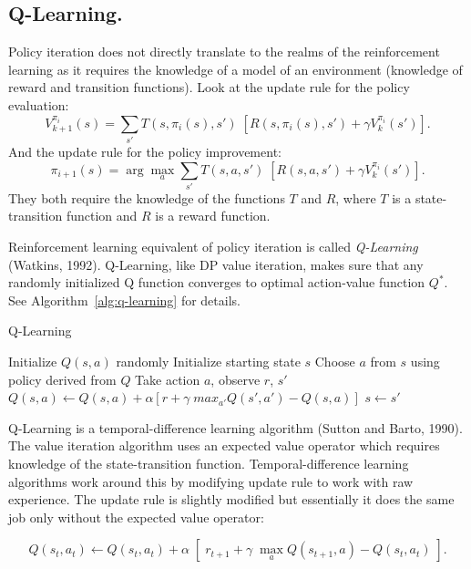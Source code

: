 \subsection{Q-Learning.}
\label{sec:q-learning}
Policy iteration does not directly translate to the realms of the reinforcement learning as it requires the knowledge of a model of an environment (knowledge of reward and transition functions). Look at the update rule for the policy evaluation:
$$ V_{k+1}^{\pi_{i}}(s) = \displaystyle\sum_{s'}T(s,\pi_{i}(s),s')\;[R(s,\pi_{i}(s),s')+\gamma V_{k}^{\pi_{i}}(s')]. $$
And the update rule for the policy improvement:
$$ \pi_{i+1}(s) = \arg\max_{a}\displaystyle\sum_{s'}T(s,a,s')\;[R(s,a,s')+\gamma V_{k}^{\pi_{i}}(s')]. $$
They both require the knowledge of the functions $T$ and $R$, where $T$ is a state-transition function and $R$ is a reward function.

Reinforcement learning equivalent of policy iteration is called \textit{Q-Learning} (Watkins, 1992\nocite{watkins1992q}). Q-Learning, like DP value iteration, makes sure that any randomly initialized Q function converges to optimal action-value function $Q^{*}$. See Algorithm~\ref{alg:q-learning} for details.
\begin{algorithm}[tb]
   \caption{Q-Learning}
   \label{alg:q-learning}
\begin{algorithmic}
    Initialize $Q(s,a)$ randomly
   \REPEAT
       \STATE Initialize starting state $s$
       \REPEAT
           \STATE Choose $a$ from $s$ using policy derived from $Q$
           \STATE Take action $a$, observe $r$, $s'$
           \STATE $Q(s,a) \leftarrow Q(s,a) + \alpha [r + \gamma\; max_{a'}Q(s',a') - Q(s,a)] $
           \STATE $ s \leftarrow s'$
\end{algorithmic}
\end{algorithm}
Q-Learning is a temporal-difference learning algorithm (Sutton and Barto, 1990\nocite{Sutton90time-derivativemodels}). The value iteration algorithm uses an expected value operator which requires knowledge of the state-transition function. Temporal-difference learning algorithms work around this by modifying update rule to work with raw experience. The update rule is slightly modified but essentially it does the same job only without the expected value operator:

$$ Q(s_{t},a_{t}) \leftarrow Q(s_{t},a_{t}) + \alpha \; \left[\;r_{t+1} + \gamma\; \max_{a}Q(s_{t+1},a) - Q(s_{t},a_{t})\;\right]. $$

